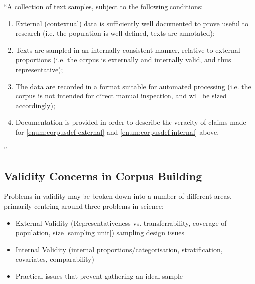 ``A collection of text samples, subject to the following conditions:

\begin{enumerate}
    \item \label{enum:corpusdef-external} External (contextual) data is sufficiently well documented to prove useful to research (i.e. the population is well defined, texts are annotated);
    \item \label{enum:corpusdef-internal} Texts are sampled in an internally-consistent manner, relative to external proportions (i.e. the corpus is externally and internally valid, and thus representative);
    \item The data are recorded in a format suitable for automated processing (i.e. the corpus is not intended for direct manual inspection, and will be sized accordingly);
    \item Documentation is provided in order to describe the veracity of claims made for \ref{enum:corpusdef-external} and \ref{enum:corpusdef-internal} above.
\end{enumerate}

''













\subsection{Validity Concerns in Corpus Building}



Problems in validity may be broken down into a number of different areas, primarily centring around three problems in science:

\begin{itemize}
    \item External Validity (Representativeness vs. transferrability, coverage of population, size [sampling unit]) sampling design issues
    \item Internal Validity (internal proportions/categorisation, stratification, covariates, comparability)
    \item Practical issues that prevent gathering an ideal sample
\end{itemize}


